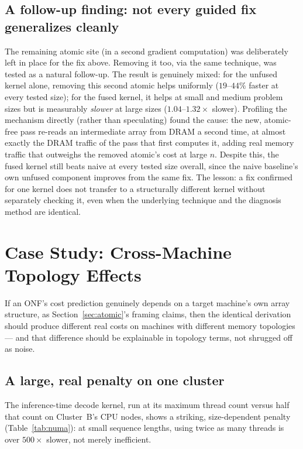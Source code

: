 \documentclass[sigconf,review,anonymous]{acmart}
\begin{document}
\subsection{A follow-up finding: not every guided fix generalizes cleanly}

The remaining atomic site (in a second gradient computation) was
deliberately left in place for the fix above. Removing it too, via the
same technique, was tested as a natural follow-up. The result is
genuinely mixed: for the unfused kernel alone, removing this second
atomic helps uniformly ($19$--$44\%$ faster at every tested size); for
the fused kernel, it helps at small and medium problem sizes but is
measurably \emph{slower} at large sizes ($1.04$--$1.32\times$ slower).
Profiling the mechanism directly (rather than speculating) found the
cause: the new, atomic-free pass re-reads an intermediate array from
DRAM a second time, at almost exactly the DRAM traffic of the pass
that first computes it, adding real memory traffic that outweighs the
removed atomic's cost at large $n$. Despite this, the fused kernel
still beats naive at every tested size overall, since the naive
baseline's own unfused component improves from the same fix. The
lesson: a fix confirmed for one kernel does not transfer to a
structurally different kernel without separately checking it, even
when the underlying technique and the diagnosis method are identical.

\section{Case Study: Cross-Machine Topology Effects}
\label{sec:topology}

If an ONF's cost prediction genuinely depends on a target machine's own
array structure, as Section~\ref{sec:atomic}'s framing claims, then the
identical derivation should produce different real costs on machines
with different memory topologies --- and that difference should be
explainable in topology terms, not shrugged off as noise.

\subsection{A large, real penalty on one cluster}

The inference-time decode kernel, run at its maximum thread count
versus half that count on Cluster~B's CPU nodes, shows a striking,
size-dependent penalty (Table~\ref{tab:numa}): at small sequence
lengths, using twice as many threads is over $500\times$ slower, not
merely inefficient.
\end{document}
